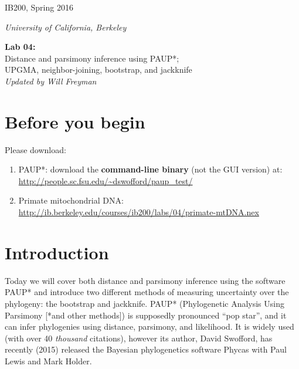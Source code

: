 \documentclass[11pt]{article}
\begin{document}
\noindent
\large
\begin{minipage}{0.5\textwidth}
\begin{flushleft} 
IB200, Spring 2016
\end{flushleft}
\end{minipage}
\begin{minipage}{0.5\textwidth}
\begin{flushright} 
\textit{University of California, Berkeley}
\end{flushright}
\end{minipage}

\vspace{0.5cm}


\begin{center}
\Large \textbf{Lab 04:} \\
Distance and parsimony inference using PAUP*; \\
UPGMA, neighbor-joining, bootstrap, and jackknife \\
\normalsize
\textit{Updated by Will Freyman}
\end{center}

\vspace{0.5cm}

\section{Before you begin}

Please download:

\begin{enumerate}
  \item PAUP*: download the \textbf{command-line binary} (not the GUI version) at: \\ 
        \url{http://people.sc.fsu.edu/~dswofford/paup_test/}
  \item Primate mitochondrial DNA: \\
        \url{http://ib.berkeley.edu/courses/ib200/labs/04/primate-mtDNA.nex}
\end{enumerate}


\section{Introduction}

Today we will cover both distance and parsimony inference using the software PAUP*
and introduce two different methods of measuring uncertainty over
the phylogeny: the bootstrap and jackknife.
PAUP* (Phylogenetic Analysis Using Parsimony [*and other methods]) is 
supposedly pronounced “pop star”, and it 
can infer phylogenies using distance, parsimony, and likelihood. 
It is widely used (with over 40 \textit{thousand} citations),
however its author, David Swofford, has recently (2015) 
released the Bayesian phylogenetics software Phycas
with Paul Lewis and Mark Holder.
\end{document}
